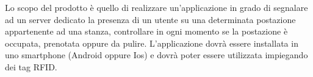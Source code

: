 Lo scopo del prodotto è quello di realizzare un’applicazione in grado di segnalare
 ad un server dedicato la presenza di un utente su una determinata postazione appartenente ad una stanza, 
 controllare in ogni momento se la postazione è occupata, prenotata oppure da pulire. 
 L’applicazione dovrà essere installata in uno smartphone (Android oppure Ios) e dovrà poter essere 
 utilizzata impiegando dei tag RFID\glo .